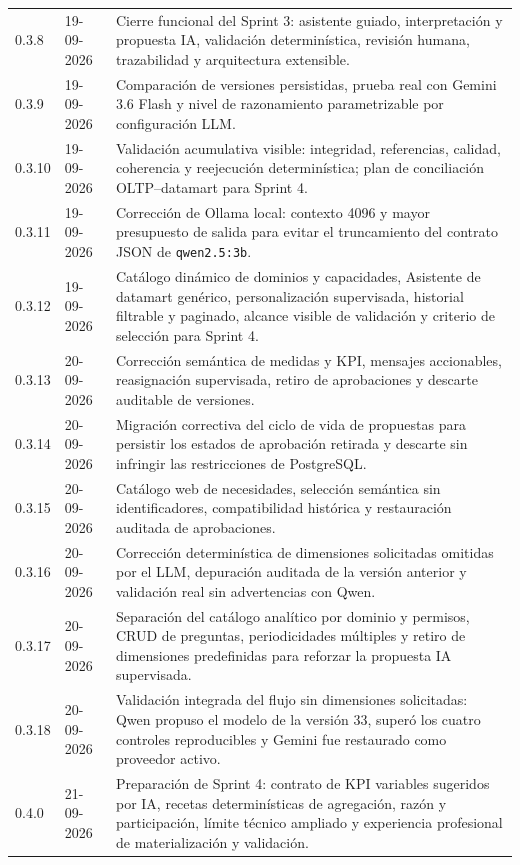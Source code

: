 \documentclass[11pt,letterpaper]{article}
\newcommand{\file}[1]{\texttt{#1}}
\begin{document}
\begin{longtable}{@{}p{0.82in}@{\hspace{0.16in}}p{0.98in}@{\hspace{0.16in}}p{4.36in}@{}}
  0.3.8 & 19-09-2026 & Cierre funcional del Sprint 3: asistente guiado, interpretación y propuesta IA, validación determinística, revisión humana, trazabilidad y arquitectura extensible. \\
  0.3.9 & 19-09-2026 & Comparación de versiones persistidas, prueba real con Gemini 3.6 Flash y nivel de razonamiento parametrizable por configuración LLM. \\
  0.3.10 & 19-09-2026 & Validación acumulativa visible: integridad, referencias, calidad, coherencia y reejecución determinística; plan de conciliación OLTP--datamart para Sprint 4. \\
  0.3.11 & 19-09-2026 & Corrección de Ollama local: contexto 4096 y mayor presupuesto de salida para evitar el truncamiento del contrato JSON de \file{qwen2.5:3b}. \\
  0.3.12 & 19-09-2026 & Catálogo dinámico de dominios y capacidades, Asistente de datamart genérico, personalización supervisada, historial filtrable y paginado, alcance visible de validación y criterio de selección para Sprint 4. \\
  0.3.13 & 20-09-2026 & Corrección semántica de medidas y KPI, mensajes accionables, reasignación supervisada, retiro de aprobaciones y descarte auditable de versiones. \\
  0.3.14 & 20-09-2026 & Migración correctiva del ciclo de vida de propuestas para persistir los estados de aprobación retirada y descarte sin infringir las restricciones de PostgreSQL. \\
  0.3.15 & 20-09-2026 & Catálogo web de necesidades, selección semántica sin identificadores, compatibilidad histórica y restauración auditada de aprobaciones. \\
  0.3.16 & 20-09-2026 & Corrección determinística de dimensiones solicitadas omitidas por el LLM, depuración auditada de la versión anterior y validación real sin advertencias con Qwen. \\
  0.3.17 & 20-09-2026 & Separación del catálogo analítico por dominio y permisos, CRUD de preguntas, periodicidades múltiples y retiro de dimensiones predefinidas para reforzar la propuesta IA supervisada. \\
  0.3.18 & 20-09-2026 & Validación integrada del flujo sin dimensiones solicitadas: Qwen propuso el modelo de la versión 33, superó los cuatro controles reproducibles y Gemini fue restaurado como proveedor activo. \\
  0.4.0 & 21-09-2026 & Preparación de Sprint 4: contrato de KPI variables sugeridos por IA, recetas determinísticas de agregación, razón y participación, límite técnico ampliado y experiencia profesional de materialización y validación. \\

\end{longtable}
\end{document}
